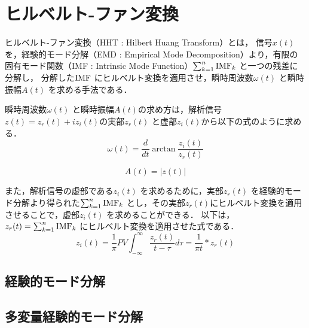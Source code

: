 \chapter{ヒルベルト-ファン変換}
%
ヒルベルト-ファン変換（HHT : Hilbert Huang Transform）とは，
信号$x(t)$ を，経験的モード分解（EMD : Empirical Mode Decomposition）より，有限の固有モード関数（IMF : Intrinsic Mode Function）$\sum_{k=1}^{n}{\rm{IMF}}_{k}$ と一つの残差に分解し，
分解した$\rm{IMF}$ にヒルベルト変換を適用させ，瞬時周波数$\omega(t)$ と瞬時振幅$A(t)$ を求める手法である．
%

瞬時周波数$\omega(t)$ と瞬時振幅$A(t)$の求め方は，解析信号$z(t) = z_{r}(t) + iz_{i}(t)$の実部$z_{r}(t)$ と虚部$z_{i}(t)$から以下の式のように求める．
\begin{equation}
    \label{inst freq}
    \omega(t) = \frac{d}{dt}\arctan\frac{z_{i}(t)}{z_{r}(t)}
\end{equation}

\begin{equation}
    \label{inst amp}
    A(t) = |z(t)|
\end{equation}

また，解析信号の虚部である$z_{i}(t)$ を求めるために，実部$z_{r}(t)$ を経験的モード分解より得られた$\sum_{k=1}^{n}{\rm{IMF}}_{k}$ とし，その実部$z_{r}(t)$にヒルベルト変換を適用させることで，虚部$z_{i}(t)$ を求めることができる．
以下は，$z_{r}(t) = \sum_{k=1}^{n}{\rm{IMF}}_{k}$ にヒルベルト変換を適用させた式である．
\begin{equation}
    z_{i}(t) = \frac{1}{\pi}PV \int_{-\infty}^{\infty} \frac{z_{r}(t)}{t - \tau} d \tau = \frac{1}{\pi t} * z_{r}(t)
\end{equation}

%

\section{経験的モード分解}

\section{多変量経験的モード分解}

